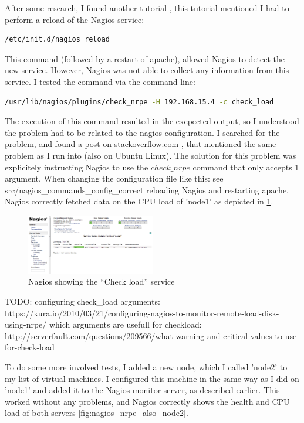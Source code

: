 \documentclass[12pt]{report}
\begin{document}
After some research, I found another tutorial
\cite{nrpe_config_tutorial},
this tutorial mentioned I had to perform a reload of the Nagios
service:
\begin{lstlisting}[language=bash]
  /etc/init.d/nagios reload 
\end{lstlisting} 
This command (followed by a restart of apache), allowed Nagios to
detect the new service.
However, Nagios was not able to collect any information from this
service. I tested the command via the command line:
\begin{lstlisting}[language=bash]
  /usr/lib/nagios/plugins/check_nrpe -H 192.168.15.4 -c check_load
\end{lstlisting} 
The execution of this command resulted in the excpected output, 
so I understood the problem had to be related to the nagios
configuration.
I searched for the problem, and found a post on stackoverflow.com
\cite{stackoverflow_nagios},
that mentioned the same problem as I run into (also on Ubuntu Linux). 
The solution for this problem was explicitely instructing Nagios to
use the $check\_nrpe$ command that only accepts 1 argument.
When changing the configuration file like this:
see src/nagios\_commands\_config\_correct
reloading Nagios and restarting apache, Nagios correctly fetched data
on the CPU load of 'node1' as depicted in
\cref{fig:nagios_nrpe_working_check_load}.

\begin{figure}[h!]
  \caption{Nagios showing the ``Check load'' service}
  \label{fig:nagios_nrpe_working_check_load}
  \centering
    \includegraphics[width=0.5\textwidth]{pics/nagios_2.png}
\end{figure}

TODO:
configuring check\_load arguments: https://kura.io/2010/03/21/configuring-nagios-to-monitor-remote-load-disk-using-nrpe/
which arguments are usefull for checkload:
http://serverfault.com/questions/209566/what-warning-and-critical-values-to-use-for-check-load

To do some more involved tests, I added a new node, which I called
'node2' to my list of virtual machines. I configured this machine in
the same way as I did on 'node1' and added it to the Nagios monitor
server, as described earlier.
This worked without any problems, and Nagios correctly shows the health
and CPU load of both servers 
\cref{fig:nagios_nrpe_also_node2}.
\end{document}
